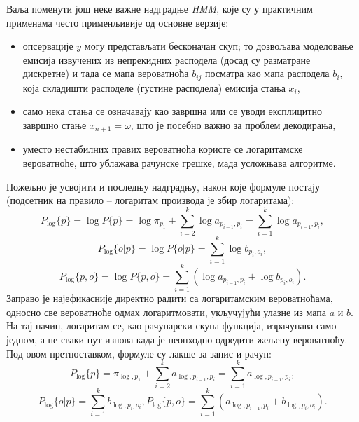 \documentclass[12pt,oneside]{memoir}
\begin{document}
\begin{CJK}{UTF8}{ipxm}
Ваља поменути још неке важне надградње \textit{HMM}, које су у практичним применама често применљивије од основне верзије:
\begin{itemize}
  \item опсервације $y$ могу представљати бесконачан скуп; то дозвољава моделовање емисија извучених из непрекидних расподела (досад су разматране дискретне) и тада се мапа вероватноћа $b_{ij}$ посматра као мапа расподела $b_i$, која складишти расподеле (густине расподела) емисија стања $x_i$,
  \item само нека стања се означавају као завршна или се уводи експлицитно завршно стање $x_{n+1} = \omega$, што је посебно важно за проблем декодирања,
  \item уместо нестабилних правих вероватноћа користе се логаритамске вероватноће, што ублажава рачунске грешке, мада усложњава алгоритме.
\end{itemize}

Пожељно је усвојити и последњу надградњу, након које формуле постају (подсетник на правило -- логаритам производа је збир логаритама): $$P_{\log}\{p\} = \log P\{p\} = \log \pi_{p_1} + \sum_{i=2}^k \log a_{p_{i-1}, p_i} = \sum_{i=1}^k \log a_{p_{i-1}, p_i},$$ $$P_{\log}\{o | p\} = \log P\{o | p\} = \sum_{i=1}^k \log b_{p_i, o_i},$$ $$P_{\log}\{p, o\} = \log P\{p, o\} = \sum_{i=1}^k (\log a_{p_{i-1}, p_i} + \log b_{p_i, o_i}).$$ Заправо је најефикасније директно радити са логаритамским вероватноћама, односно све вероватноће одмах логаритмовати, укључујући улазне из мапа $a$ и $b$. На тај начин, логаритам се, као рачунарски скупа функција, израчунава само једном, а не сваки пут изнова када је неопходно одредити жељену вероватноћу. Под овом претпоставком, формуле су лакше за запис и рачун: $$P_{\log}\{p\} = \pi_{\log, p_1} + \sum_{i=2}^k a_{\log, p_{i-1}, p_i} = \sum_{i=1}^k a_{\log, p_{i-1}, p_i},$$ $$P_{\log}\{o | p\} = \sum_{i=1}^k b_{\log, p_i, o_i}, P_{\log}\{p, o\} = \sum_{i=1}^k (a_{\log, p_{i-1}, p_i} + b_{\log, p_i, o_i}).$$


\end{CJK}
\end{document}
